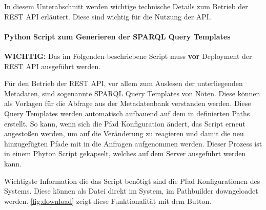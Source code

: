 In diesem Unterabschnitt werden wichtige technische Details zum Betrieb der \visit REST API erläutert. Diese sind wichtig für die Nutzung der API.

\paragraph{Python Script zum Generieren der SPARQL Query Templates}

\textbf{WICHTIG:} Das im Folgenden beschriebene Script muss \textbf{vor} Deployment der REST API ausgeführt werden.

Für den Betrieb der REST API, vor allem zum Auslesen der unterliegenden Metadaten, sind sogenannte SPARQL Query Templates von Nöten. Diese können als Vorlagen für die Abfrage aus der Metadatenbank verstanden werden. Diese Query Templates werden automatisch aufbauend auf dem in \wisski definierten Paths erstellt. So kann, wenn sich die \wisski Pfad Konfiguration ändert, das Script erneut angestoßen werden, um auf die Veränderung zu reagieren und damit die neu hinzugefügten Pfade mit in die Anfragen aufgenommen werden. Dieser Prozess ist in einem Phyton Script gekapselt, welches auf dem \visit Server ausgeführt werden kann.

Wichtigste Information die das Script benötigt sind die Pfad Konfigurationen des \wisski Systems. Diese können als Datei direkt im \wisski System, im Pathbuilder downgeloadet werden. \autoref{fig:download} zeigt diese Funktionalität mit dem \texttt{} Button.

